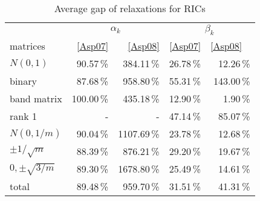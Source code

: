 \begin{table} 
 \begin{scriptsize} \caption{Average gap of relaxations for RICs} 
 \label{lhsRhsGap} 
 \begin{tabular*}{\linewidth}{@{}l@{\;\;\extracolsep{\fill}}rrrr@{}}\toprule 
  & \multicolumn{2}{c}{$\alpha_k$} & \multicolumn{2}{c}{$\beta_k$} \\ 
\cmidrule(r){2-3} \cmidrule(l){4-5} 
matrices & \eqref{Asp07} & \eqref{Asp08} & \eqref{Asp07} & \eqref{Asp08} \ 
\\ \midrule 
$N(0,1)$ & \num{90.57}\,\% & \num{384.11}\,\% & \num{26.78}\,\% & \num{12.26}\,\% \\ 
binary & \num{87.68}\,\% & \num{958.80}\,\% & \num{55.31}\,\% & \num{143.00}\,\% \\ 
band matrix & \num{100.00}\,\% & \num{435.18}\,\% & \num{12.90}\,\% & \num{1.90}\,\% \\ 
rank 1& - &- & \num{47.14}\,\% & \num{85.07}\,\% \\ 
$N(0,1/m)$ & \num{90.04}\,\% & \num{1107.69}\,\% & \num{23.78}\,\% & \num{12.68}\,\% \\ 
$\pm 1/\sqrt{m}$ & \num{88.39}\,\% & \num{876.21}\,\% & \num{29.20}\,\% & \num{19.67}\,\% \\ 
$0, \pm \sqrt{3/m}$ & \num{89.30}\,\% & \num{1678.80}\,\% & \num{25.49}\,\% & \num{14.61}\,\% \\ 
\midrule 
total &  \num{89.48}\,\% & \num{959.70}\,\% & \num{31.51}\,\% & \num{41.31}\,\%\\ 
\bottomrule 
 \end{tabular*} 
 \end{scriptsize} 
 \end{table} 